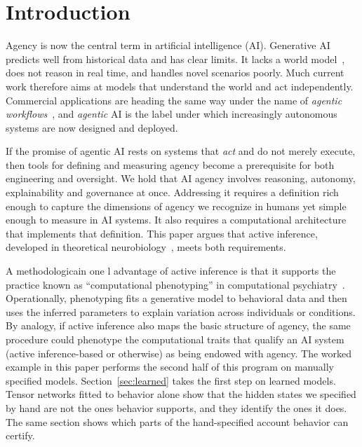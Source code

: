 \documentclass[letterpaper]{article} %
\theoremstyle{definition}
\begin{document}
\section{Introduction}\label{Introduction}

Agency is now the central term in artificial intelligence (AI). Generative AI predicts well from historical data and has clear limits. It lacks a world model~\citep{lecunPathAutonomousMachine2022}, does not reason in real time, and handles novel scenarios poorly. Much current work therefore aims at models that understand the world and act independently. Commercial applications are heading the same way under the name of \emph{agentic workflows}~\citep{ngAgenticDesignPatterns2024}, and \emph{agentic} AI is the label under which increasingly autonomous systems are now designed and deployed.

If the promise of agentic AI rests on systems that \emph{act} and do not merely execute, then tools for defining and measuring agency become a prerequisite for both engineering and oversight. We hold that AI agency involves reasoning, autonomy, explainability and governance at once. Addressing it requires a definition rich enough to capture the dimensions of agency we recognize in humans yet simple enough to measure in AI systems. It also requires a computational architecture that implements that definition. This paper argues that active inference, developed in theoretical neurobiology~\citep{parrActiveInferenceFree2022a}, meets both requirements.

A methodologicain one l advantage of active inference is that it supports the practice known as ``computational phenotyping'' in computational psychiatry~\citep{montagueComputationalPsychiatry2012,schwartenbeck2016computational,smithStepByStep2022}. Operationally, phenotyping fits a generative model to behavioral data and then uses the inferred parameters to explain variation across individuals or conditions. By analogy, if active inference also maps the basic structure of agency, the same procedure could phenotype the computational traits that qualify an AI system (active inference-based or otherwise) as being endowed with agency. The worked example in this paper performs the second half of this program on manually specified models. Section~\ref{sec:learned} takes the first step on learned models. Tensor networks fitted to behavior alone show that the hidden states we specified by hand are not the ones behavior supports, and they identify the ones it does. The same section shows which parts of the hand-specified account behavior can certify.
\end{document}
